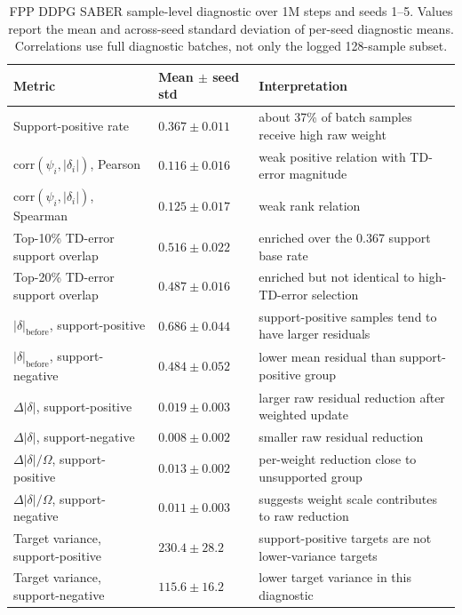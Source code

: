 \documentclass[letterpaper]{article}
\begin{document}
\begin{table}[t]
\centering
\small
\caption{FPP DDPG SABER sample-level diagnostic over 1M steps and seeds 1--5. Values report the mean and across-seed standard deviation of per-seed diagnostic means. Correlations use full diagnostic batches, not only the logged 128-sample subset.}
\label{tab:fpp-ddpg-diagnostic}
\begin{tabular}{p{}p{}p{}}
\toprule
Metric & Mean \(\pm\) seed std & Interpretation \\
\midrule
Support-positive rate & \(0.367 \pm 0.011\) & about 37\% of batch samples receive high raw weight \\
\(\mathrm{corr}(\psi_i,|\delta_i|)\), Pearson & \(0.116 \pm 0.016\) & weak positive relation with TD-error magnitude \\
\(\mathrm{corr}(\psi_i,|\delta_i|)\), Spearman & \(0.125 \pm 0.017\) & weak rank relation \\
Top-10\% TD-error support overlap & \(0.516 \pm 0.022\) & enriched over the 0.367 support base rate \\
Top-20\% TD-error support overlap & \(0.487 \pm 0.016\) & enriched but not identical to high-TD-error selection \\
\(|\delta|_{\mathrm{before}}\), support-positive & \(0.686 \pm 0.044\) & support-positive samples tend to have larger residuals \\
\(|\delta|_{\mathrm{before}}\), support-negative & \(0.484 \pm 0.052\) & lower mean residual than support-positive group \\
\(\Delta|\delta|\), support-positive & \(0.019 \pm 0.003\) & larger raw residual reduction after weighted update \\
\(\Delta|\delta|\), support-negative & \(0.008 \pm 0.002\) & smaller raw residual reduction \\
\(\Delta|\delta|/\Omega\), support-positive & \(0.013 \pm 0.002\) & per-weight reduction close to unsupported group \\
\(\Delta|\delta|/\Omega\), support-negative & \(0.011 \pm 0.003\) & suggests weight scale contributes to raw reduction \\
Target variance, support-positive & \(230.4 \pm 28.2\) & support-positive targets are not lower-variance targets \\
Target variance, support-negative & \(115.6 \pm 16.2\) & lower target variance in this diagnostic \\
\bottomrule
\end{tabular}
\end{table}
\end{document}
